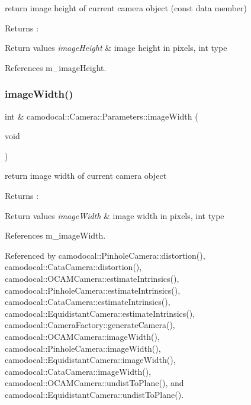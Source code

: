 return image height of current camera object (const data member) 

\begin{DoxyReturn}{Returns}
\+: 
\end{DoxyReturn}

\begin{DoxyRetVals}{Return values}
{\em image\+Height} & image height in pixels, int type \\
\hline
\end{DoxyRetVals}


References m\+\_\+image\+Height.

\mbox{\label{classcamodocal_1_1Camera_1_1Parameters_a92c11d296cb64c91a0c15528a8a7b813}} 
\subsubsection{\texorpdfstring{image\+Width()}{imageWidth()}\hspace{0.1cm}{\footnotesize\ttfamily [1/2]}}
{\footnotesize\ttfamily int \& camodocal\+::\+Camera\+::\+Parameters\+::image\+Width (\begin{DoxyParamCaption}\item[{void}]{ }\end{DoxyParamCaption})}



return image width of current camera object 

\begin{DoxyReturn}{Returns}
\+: 
\end{DoxyReturn}

\begin{DoxyRetVals}{Return values}
{\em image\+Width} & image width in pixels, int type \\
\hline
\end{DoxyRetVals}


References m\+\_\+image\+Width.



Referenced by camodocal\+::\+Pinhole\+Camera\+::distortion(), camodocal\+::\+Cata\+Camera\+::distortion(), camodocal\+::\+O\+C\+A\+M\+Camera\+::estimate\+Intrinsics(), camodocal\+::\+Pinhole\+Camera\+::estimate\+Intrinsics(), camodocal\+::\+Cata\+Camera\+::estimate\+Intrinsics(), camodocal\+::\+Equidistant\+Camera\+::estimate\+Intrinsics(), camodocal\+::\+Camera\+Factory\+::generate\+Camera(), camodocal\+::\+O\+C\+A\+M\+Camera\+::image\+Width(), camodocal\+::\+Pinhole\+Camera\+::image\+Width(), camodocal\+::\+Equidistant\+Camera\+::image\+Width(), camodocal\+::\+Cata\+Camera\+::image\+Width(), camodocal\+::\+O\+C\+A\+M\+Camera\+::undist\+To\+Plane(), and camodocal\+::\+Equidistant\+Camera\+::undist\+To\+Plane().

